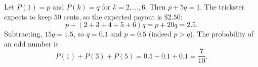 Let $P(1)=p$ and $P(k)=q$ for $k=2,\dots,6$. Then $p+5q=1$. The trickster expects to keep $50$ cents, so the expected payout is $\$2.50$:
\[
p+(2+3+4+5+6)q=p+20q=2.5 .
\]
Subtracting, $15q=1.5$, so $q=0.1$ and $p=0.5$ (indeed $p>q$). The probability of an odd number is
\[
P(1)+P(3)+P(5)=0.5+0.1+0.1=\boxed{\dfrac{7}{10}} .
\]
